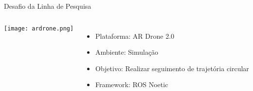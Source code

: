 \begin{frame}[t]{Desafio da Linha de Pesquisa}
    \transdissolve[duration=0.5]
    \begin{columns}
        \vspace*{0.5cm}
        \texttt{[image: ardrone.png]}
        \Large{
        \begin{itemize}
            \item Plataforma: AR Drone 2.0
            \item Ambiente: Simulação
            \item Objetivo: Realizar seguimento de trajetória circular
            \item Framework: ROS Noetic
        \end{itemize}
        }
    \end{columns}

    
\end{frame}
    
